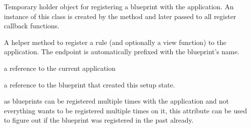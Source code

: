 \documentclass[a4paper,12pt]{sphinxmanual}
\begin{document}
\begin{fulllineitems}
\label{api:flask.blueprints.BlueprintSetupState}
Temporary holder object for registering a blueprint with the
application.  An instance of this class is created by the
{\hyperref[api:flask.Blueprint.make_setup_state]{}} method and later passed
to all register callback functions.

\begin{fulllineitems}
\label{api:flask.blueprints.BlueprintSetupState.add_url_rule}
A helper method to register a rule (and optionally a view function)
to the application.  The endpoint is automatically prefixed with the
blueprint's name.

\end{fulllineitems}


\begin{fulllineitems}
\label{api:flask.blueprints.BlueprintSetupState.app}
a reference to the current application

\end{fulllineitems}


\begin{fulllineitems}
\label{api:flask.blueprints.BlueprintSetupState.blueprint}
a reference to the blueprint that created this setup state.

\end{fulllineitems}


\begin{fulllineitems}
\label{api:flask.blueprints.BlueprintSetupState.first_registration}
as blueprints can be registered multiple times with the
application and not everything wants to be registered
multiple times on it, this attribute can be used to figure
out if the blueprint was registered in the past already.


\end{fulllineitems}
\end{fulllineitems}
\end{document}

